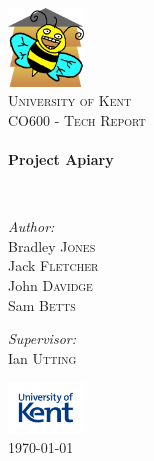 \begin{titlepage}
\begin{center}


\graphicspath{{./pics/}}
\includegraphics[width=0.15\textwidth]{logo.png}~\\[1cm]

\textsc{\LARGE University of Kent}\\[1.5cm]

\textsc{\Large CO600 - Tech Report}\\[0.5cm]

\HRule \\[0.4cm]
{ \huge \bfseries Project Apiary \\[0.4cm] }

\HRule \\[1.5cm]

\begin{minipage}{0.4\textwidth}
\begin{flushleft} \large
\emph{Author:}\\
Bradley \textsc{Jones}\\
Jack \textsc{Fletcher}\\
John \textsc{Davidge}\\
Sam \textsc{Betts}\\
\end{flushleft}
\end{minipage}
\begin{minipage}{0.4\textwidth}
\begin{flushright} \large
\emph{Supervisor:} \\
Ian \textsc{Utting}
\end{flushright}
\end{minipage}

\vfill


\includegraphics[width=0.15\textwidth]{kentlogo.jpg}~\\[1cm]
{\large \today}

\end{center}
\end{titlepage}
